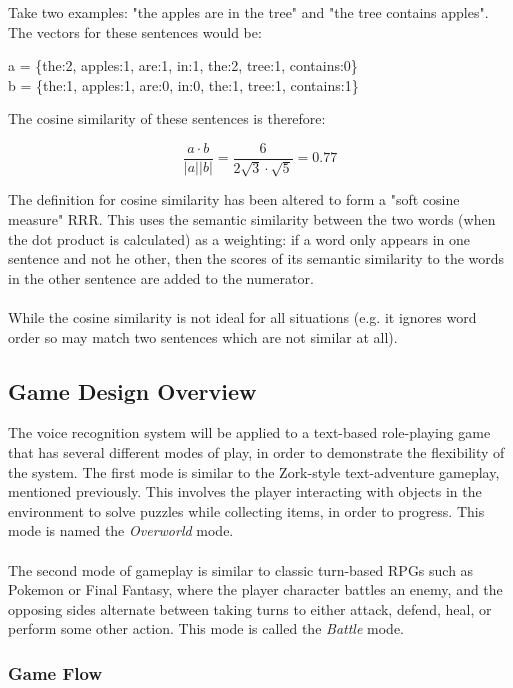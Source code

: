 \documentclass[12pt]{article}
\begin{document}
Take two examples: "the apples are in the tree" and "the tree contains apples". The vectors for these sentences would be:

\begin{center}
a = \{the:2, apples:1, are:1, in:1, the:2, tree:1, contains:0\}
\\
b = \{the:1, apples:1, are:0, in:0, the:1, tree:1, contains:1\}
\end{center}

The cosine similarity of these sentences is therefore:

$$\frac{a \cdot b}{\lvert a\rvert\lvert b\rvert} = \frac{6}{2\sqrt{3} \cdot \sqrt{5}} = 0.77$$

The definition for cosine similarity has been altered to form a "soft cosine measure" RRR. This uses the semantic similarity between the two words (when the dot product is calculated) as a weighting: if a word only appears in one sentence and not he other, then the scores of its semantic similarity to the words in the other sentence are added to the numerator.
\\
\\
While the cosine similarity is not ideal for all situations (e.g. it ignores word order so may match two sentences which are not similar at all).

\subsection{Game Design Overview}

The voice recognition system will be applied to a text-based role-playing game that has several different modes of play, in order to demonstrate the flexibility of the system. The first mode is similar to the Zork-style text-adventure gameplay, mentioned previously. This involves the player interacting with objects in the environment to solve puzzles while collecting items, in order to progress. This mode is named the \textit{Overworld} mode.
\\
\\
The second mode of gameplay is similar to classic turn-based RPGs such as Pokemon or Final Fantasy, where the player character battles an enemy, and the opposing sides alternate between taking turns to either attack, defend, heal, or perform some other action. This mode is called the \textit{Battle} mode.

\subsubsection{Game Flow}
\end{document}
